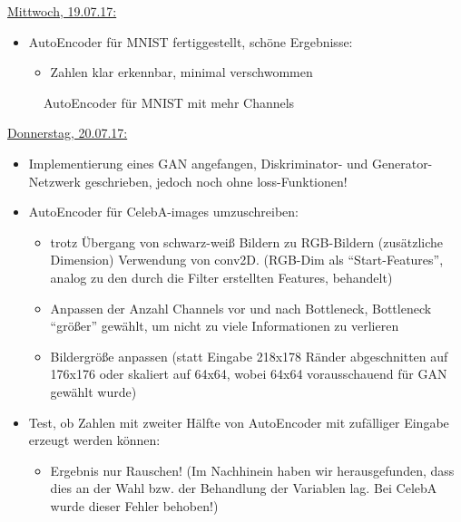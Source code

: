 \documentclass[10pt,a4paper]{report}
\begin{document}
\bigskip	
\uline{Mittwoch, 19.07.17:}
\begin{itemize}
\item AutoEncoder für MNIST fertiggestellt, schöne Ergebnisse:
\begin{itemize}
\item Zahlen klar erkennbar, minimal verschwommen
\end{itemize}
\end{itemize}

\begin{figure}[H]
\centering
{} 
\hspace{0.5cm}
\caption{AutoEncoder für MNIST mit mehr Channels}
\end{figure}

\bigskip
\uline{Donnerstag, 20.07.17:}
\begin{itemize}
\item Implementierung eines GAN angefangen, Diskriminator- und Generator-Netzwerk geschrieben, jedoch noch ohne loss-Funktionen!
\item AutoEncoder für CelebA-images umzuschreiben:
	\begin{itemize}
	\item trotz Übergang von schwarz-weiß Bildern zu RGB-Bildern (zusätzliche Dimension) Verwendung von conv2D. (RGB-Dim als \enquote{Start-Features}, analog zu den durch die Filter erstellten Features, behandelt)
	\item Anpassen der Anzahl Channels vor und nach Bottleneck, Bottleneck \enquote{größer} gewählt, um nicht zu viele Informationen zu verlieren
	\item Bildergröße anpassen (statt Eingabe 218x178 Ränder abgeschnitten auf 176x176 oder skaliert auf 64x64, wobei 64x64 vorausschauend für GAN gewählt wurde)
	\end{itemize}
\item Test, ob Zahlen mit zweiter Hälfte von AutoEncoder mit zufälliger Eingabe erzeugt werden können:
\begin{itemize}
\item Ergebnis nur Rauschen! (Im Nachhinein haben wir herausgefunden, dass dies an der Wahl bzw. der Behandlung der Variablen lag. Bei CelebA wurde dieser Fehler behoben!)
\end{itemize}
\end{itemize}
\end{document}
